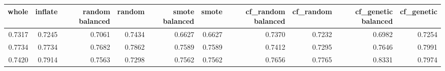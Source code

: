 \begin{tabular}{rrrrrrrrrr}
\toprule

 whole &  inflate &  random balanced &  random &  smote balanced &  smote &  cf\_random balanced &  cf\_random &  cf\_genetic balanced &  cf\_genetic \\
\midrule

0.7317 &   0.7245 &           0.7061 &  0.7434 &          0.6627 & 0.6627 &              0.7370 &     0.7232 &               0.6982 &      0.7254 \\
0.7734 &   0.7734 &           0.7682 &  0.7862 &          0.7589 & 0.7589 &              0.7412 &     0.7295 &               0.7646 &      0.7991 \\
0.7420 &   0.7914 &           0.7563 &  0.7298 &          0.7562 & 0.7562 &              0.7656 &     0.7765 &               0.8331 &      0.7974 \\

\bottomrule
\end{tabular}
